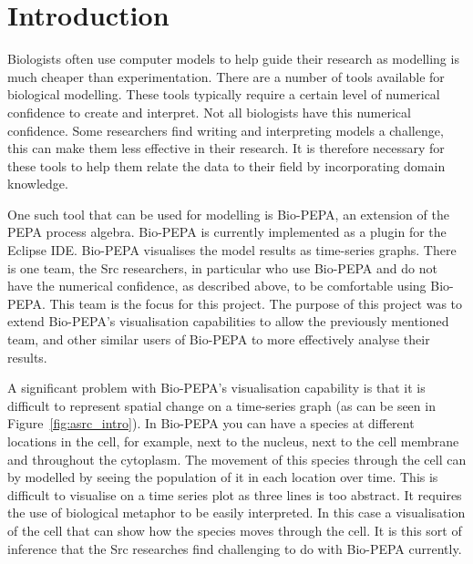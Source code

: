 \section{Introduction}

Biologists often use computer models to help guide their research as modelling is much cheaper than experimentation.  There are a number of tools available for biological modelling.  These tools typically require a certain level of numerical confidence to create and interpret.  Not all biologists have this numerical confidence.  Some researchers find writing and interpreting models a challenge, this can make them less effective in their research.  It is therefore necessary for these tools to help them relate the data to their field by incorporating domain knowledge.

One such tool that can be used for modelling is Bio-PEPA, an extension of the PEPA process algebra.  Bio-PEPA is currently implemented as a plugin for the Eclipse IDE.  Bio-PEPA visualises the model results as time-series graphs.  There is one team, the Src researchers, in particular who use Bio-PEPA and do not have the numerical confidence, as described above, to be comfortable using Bio-PEPA.  This team is the focus for this project.  The purpose of this project was to extend Bio-PEPA's visualisation capabilities to allow the previously mentioned team, and other similar users of Bio-PEPA to more effectively analyse their results.

A significant problem with Bio-PEPA's visualisation capability is that it is difficult to represent spatial change on a time-series graph (as can be seen in Figure~\ref{fig:asrc_intro}).  In Bio-PEPA you can have a species at different locations in the cell, for example, next to the nucleus, next to the cell membrane and throughout the cytoplasm.  The movement of this species through the cell can by modelled by seeing the population of it in each location over time.  This is difficult to visualise on a time series plot as three lines is too abstract.  It requires the use of biological metaphor to be easily interpreted.  In this case a visualisation of the cell that can show how the species moves through the cell.  It is this sort of inference that the
Src researches find challenging to do with Bio-PEPA currently.

